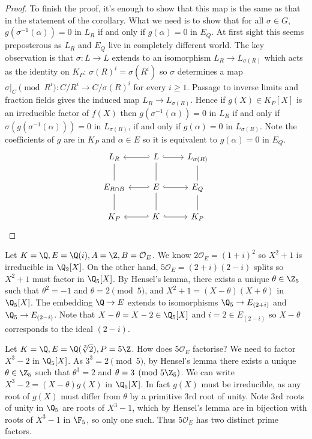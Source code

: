 \documentclass[a4paper]{article}
\renewcommand*{\O}{\mathcal{O}}
\begin{document}
\begin{proof}
  To finish the proof, it's enough to show that this map is the same as that in the statement of the corollary. What we need is to show that for all \(\sigma \in G\), \(g(\sigma^{-1}(\alpha)) = 0\) in \(L_R\) if and only if \(g(\alpha) = 0\) in \(E_Q\). At first sight this seems preposterous as \(L_R\) and \(E_Q\) live in completely different world. The key observation is that \(\sigma: L \to L\) extends to an isomorphism \(L_R \to L_{\sigma(R)}\) which acts as the identity on \(K_P\): \(\sigma(R)^i = \sigma(R^i)\) so \(\sigma\) determines a map \(\sigma|_C \pmod{R^i}: C/R^i \to C/\sigma(R)^i\) for every \(i \geq 1\). Passage to inverse limits and fraction fields gives the induced map \(L_R \to L_{\sigma(R)}\). Hence if \(g(X) \in K_P[X]\) is an irreducible factor of \(f(X)\) then \(g(\sigma^{-1}(\alpha)) = 0\) in \(L_R\) if and only if \(\sigma(g(\sigma^{-1}(\alpha))) = 0\) in \(L_{\sigma(R)}\), if and only if \(g(\alpha) = 0\) in \(L_{\sigma(R)}\). Note the coefficients of \(g\) are in \(K_P\) and \(\alpha \in E\) so it is equivalent to \(g(\alpha) = 0\) in \(E_Q\).
  \[
    \begin{tikzcd}
      L_R \ar[d, dash] & L \ar[d, dash] \ar[l, hook'] \ar[r, hook] & L_{\sigma(R)} \ar[d, dash] \\
      E_{R \cap B} \ar[d, dash] & E \ar[d, dash] \ar[l, hook'] \ar[r, hook] & E_Q \ar[d, dash] \\
      K_P & K \ar[l, hook'] \ar[r, hook] & K_P
    \end{tikzcd}
  \]
\end{proof}

\begin{eg}
  Let \(K = \Q, E = \Q(i), A = \Z, B = \O_E\). We know \(2 \O_E = (1 + i)^2\) so \(X^2 + 1\) is irreducible in \(\Q_2[X]\). On the other hand, \(5 \O_E = (2 + i)(2 - i)\) splits so \(X^2 + 1\) must factor in \(\Q_5[X]\). By Hensel's lemma, there exists a unique \(\theta \in \Z_5\) such that \(\theta^2 = -1\) and \(\theta = 2 \pmod 5\), and \(X^2 + 1 = (X - \theta)(X + \theta)\) in \(\Q_5[X]\). The embedding \(\Q \to E\) extends to isomorphisms \(\Q_5 \to E_{(2 + i)}\) and \(\Q_5 \to E_{(2 - i)}\). Note that \(X - \theta = X - 2 \in \Q_5[X]\) and \(i = 2 \in E_{(2 - i)}\) so \(X - \theta\) corresponds to the ideal \((2 - i)\).
\end{eg}

\begin{eg}
  Let \(K = \Q, E = \Q(\sqrt[3]{2}), P = 5\Z\). How does \(5\O_E\) factorise? We need to factor \(X^3 - 2\) in \(\Q_5[X]\). As \(3^3 = 2 \pmod 5\), by Hensel's lemma there exists a unique \(\theta \in \Z_5\) such that \(\theta^3 = 2\) and \(\theta = 3 \pmod{5\Z_5}\). We can write \(X^3 - 2 = (X - \theta) g(X)\) in \(\Q_5[X]\). In fact \(g(X)\) must be irreducible, as any root of \(g(X)\) must differ from \(\theta\) by a primitive 3rd root of unity. Note 3rd roots of unity in \(\Q_5\) are roots of \(X^3 - 1\), which by Hensel's lemma are in bijection with roots of \(X^3 - 1\) in \(\F_5\), so only one such. Thus \(5\O_E\) has two distinct prime factors.
\end{eg}
\end{document}
